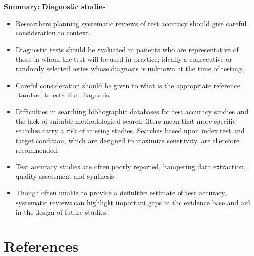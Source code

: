 \documentclass[
  10pt,
  a4paper,
  DIV=11,
  numbers=noendperiod]{scrreprt}
\begin{document}
\textbf{Summary: Diagnostic studies}

\begin{itemize}
\item
  Researchers planning systematic reviews of test accuracy should give
  careful consideration to context.
\item
  Diagnostic tests should be evaluated in patients who are
  representative of those in whom the test will be used in practice;
  ideally a consecutive or randomly selected series whose diagnosis is
  unknown at the time of testing.
\item
  Careful consideration should be given to what is the appropriate
  reference standard to establish diagnosis.
\item
  Difficulties in searching bibliographic databases for test accuracy
  studies and the lack of suitable methodological search filters mean
  that more specific searches carry a risk of missing studies. Searches
  based upon index test and target condition, which are designed to
  maximize sensitivity, are therefore recommended.
\item
  Test accuracy studies are often poorly reported, hampering data
  extraction, quality assessment and synthesis.
\item
  Though often unable to provide a definitive estimate of test accuracy,
  systematic reviews can highlight important gaps in the evidence base
  and aid in the design of future studies.
\end{itemize}


\chapter*{References}\label{references}

\end{document}
